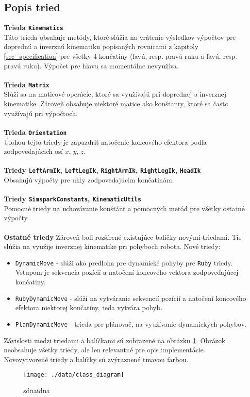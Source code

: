 \subsection{Popis tried} \label{sec_classes_desc}
\textbf{Trieda \texttt{Kinematics}}
\\
Táto trieda obsahuje metódy, ktoré slúžia na vrátenie výsledkov výpočtov pre doprednú a inverznú kinematiku popísaných rovnicami z kapitoly \ref{sec_specification} pre všetky 4 končatiny (ľavú, resp. pravú ruku a ľavú, resp. pravú ruku). Výpočet pre hlavu sa momentálne nevyužíva.
\\\\
\textbf{Trieda \texttt{Matrix}}
\\
Slúži sa na maticové operácie, ktoré sa využívajú pri doprednej a inverznej kinematike. Zároveň obsahuje niektoré matice ako konštanty, ktoré sa často využívajú pri výpočtoch. 
\\\\
\textbf{Trieda \texttt{Orientation}}
\\
Úlohou tejto triedy je zapuzdriť natočenie koncového efektora podľa zodpovedajúcich osí $x$, $y$, $z$.
\\\\
\textbf{Triedy \texttt{LeftArmIk}, \texttt{LeftLegIk}, \texttt{RightArmIk}, \texttt{RightLegIk}, \texttt{HeadIk}}
\\
Obsahujú výpočty pre uhly zodpovedajúcim končatinám.
\\\\
\textbf{Triedy \texttt{SimsparkConstants}, \texttt{KinematicUtils}}
\\
Pomocné triedy na uchovávanie konštánt a pomocných metód pre všetky ostatné výpočty.
\\\\
\textbf{Ostatné triedy}
Zároveň boli rozšírené existujúce balíčky novými triedami. Tie slúžia na využije inverznej kinematike pri pohyboch robota. Nové triedy:
\begin{itemize}
	\item \texttt{DynamicMove} - slúži ako predloha pre dynamické pohyby pre \texttt{Ruby} triedy. Vstupom je sekvencia pozícií a natočení koncového vektora zodpovedajúcej končatiny.
	\item \texttt{RubyDynamicMove} - slúži na vytváranie sekvencií pozícií a natočení koncového efektora niektorej končatiny, teda vytvára pohyb.
	\item \texttt{PlanDynamicMove} - trieda pre plánovač, na využívanie dynamických pohybov.
\end{itemize}

Závislosti medzi triedami a balíčkami sú zobrazené na obrázku \ref{pic_class_diagram}. Obrázok neobsahuje všetky triedy, ale len relevantné pre opis implementácie. Novovytvorené triedy a balíčky sú zvýraznené tmavou farbou.

\begin{landscape}
\thispagestyle{empty}
\begin{figure}[H]
\centering
	\texttt{[image: ./data/class\_diagram]}
	\caption{sdnaidna}
	\label{pic_class_diagram}
\end{figure}
\end{landscape}
